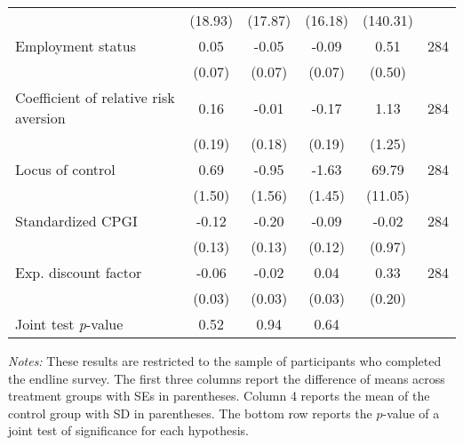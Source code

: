 \begin{table}[h]
{\begin{threeparttable}
\begin{tabular}{l*{5}{c}}
          &  (18.93)&  (17.87)&  (16.18)& (140.31)&         \\
Employment status&     0.05&    -0.05&    -0.09&     0.51&      284\\
          &   (0.07)&   (0.07)&   (0.07)&   (0.50)&         \\
Coefficient of relative risk aversion&     0.16&    -0.01&    -0.17&     1.13&      284\\
          &   (0.19)&   (0.18)&   (0.19)&   (1.25)&         \\
Locus of control&     0.69&    -0.95&    -1.63&    69.79&      284\\
          &   (1.50)&   (1.56)&   (1.45)&  (11.05)&         \\
Standardized CPGI&    -0.12&    -0.20&    -0.09&    -0.02&      284\\
          &   (0.13)&   (0.13)&   (0.12)&   (0.97)&         \\
Exp. discount factor&    -0.06&    -0.02&     0.04&     0.33&      284\\
          &   (0.03)&   (0.03)&   (0.03)&   (0.20)&         \\
\midrule Joint test \emph{p}-value&     0.52&     0.94&     0.64&         &         \\
\bottomrule \end{tabular} \begin{tablenotes}[flushleft] \footnotesize \item \emph{Notes:} These results are restricted to the sample of participants who completed the endline survey. The first three columns report the difference of means across treatment groups with SEs in parentheses. Column 4 reports the mean of the control group with SD in parentheses. The bottom row reports the \(p\)-value of a joint test of significance for each hypothesis. \end{tablenotes} \end{threeparttable} } \end{table}


